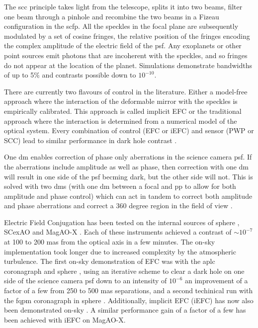 \documentclass[letterpaper]{ar-1col}
\begin{document}
The \acl{scc} \citep[\acs{scc}; ][]{Baudoz06} principle takes light from the telescope, splits it into two beams, filter one beam through a pinhole and recombine the two beams in a Fizeau configuration in the \ac{scfp}. All the speckles in the focal plane are subsequently modulated by a set of cosine fringes, the relative position of the fringes encoding the complex amplitude of the electric field of the \ac{psf}. Any exoplanets or other point sources emit photons that are incoherent with the speckles, and so fringes do not appear at the location of the planet. Simulations demonstrate \citep{Galicher10} bandwidths of up to 5\% and contrasts possible down to $10^{-10}$.

There are currently two flavours of control in the literature. Either a model-free approach where the interaction of the deformable mirror with the speckles is empirically calibrated. This approach is called implicit EFC \citep{haffert2023implicit} or the traditional approach where the interaction is determined from a numerical model of the optical system. Every combination of control (EFC or iEFC) and sensor (PWP or SCC) lead to similar performance in dark hole contrast \citep{desai2024comparative}.

%

One \ac{dm} enables correction of phase only aberrations in the science camera \ac{psf}.
%
If the aberrations include amplitude as well as phase, then correction with one \ac{dm} will result in one side of the \ac{psf} becming dark, but the other side will not.
%
This is solved with two \acp{dm} (with one \ac{dm} between a focal and \ac{pp} to allow for both amplitude and phase control) which can act in tandem to correct both amplitude and phase aberrations and correct a 360 degree region in the field of view \citep{pueyo2009optimal}.

%

Electric Field Conjugation has been tested on the internal sources of \ac{sphere} \citep{Potier20}, SCexAO \citep{ahn2023combining} and MagAO-X \citep{haffert2023implicit}. Each of these instruments achieved a contrast of $\sim 10^{-7}$ at 100 to 200 mas from the optical axis in a few minutes. The on-sky implementation took longer due to increased complexity by the atmospheric turbulence.
%
The first on-sky demonstration of EFC was with the \ac{aplc} coronagraph and \ac{sphere} \citep{Potier20,Potier22}, using an iterative scheme to clear a dark hole on one side of the science camera \ac{psf} down to an intensity of $10^{-6}$ an improvement of a factor of a few from 250 to 500 mas separations, and a second techinical run with the \ac{fqpm} coronagraph in \ac{sphere} \citep{Galicher24}. Additionally, implicit EFC (iEFC) \citep{haffert2023implicit} has now also been demonstrated on-sky \citep{haffert2024sky, kueny2024magao}. A similar performance gain of a factor of a few has been achieved with iEFC on MagAO-X.
\end{document}
